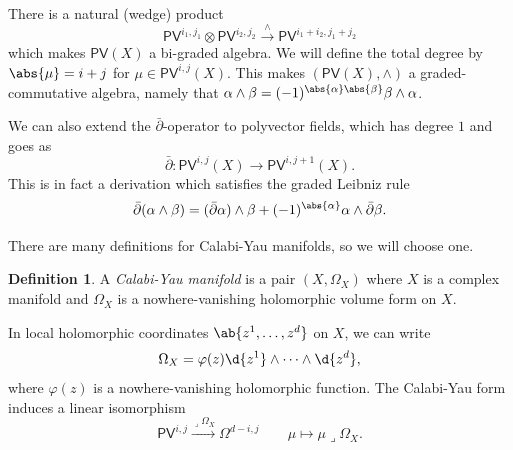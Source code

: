 \documentclass{amsart}
\theoremstyle{definition}
\newtheorem{defn}[thm]{Definition}
\theoremstyle{remark}
\theoremstyle{plain}
\theoremstyle{definition}
\theoremstyle{remark}
\newcommand{\ms}[1]{\mathsf{#1}}
\newcommand{\1}{\mathbf{1}}
\newcommand{\2}{\mathbf{2}}
\newcommand{\3}{\mathbf{3}}
\newcommand{\dbar}{\bar{\partial}}
\begin{document}
There is a natural (wedge) product
\[ \ms{PV}^{i_1, j_1} \otimes \ms{PV}^{i_2, j_2} \xrightarrow{\wedge} \ms{PV}^{i_1 + i_2, j_1 + j_2} \]
which makes \(\ms{PV}(X)\) a bi-graded algebra. We will define the total degree by \(\abs{\mu} = i + j\) for \(\mu \in \ms{PV}^{i,j}(X)\). This makes \((\ms{PV}(X), \wedge)\) a graded-commutative algebra, namely that \(\alpha \wedge \beta = (-1)^{\abs{\alpha} \abs{\beta}} \beta \wedge \alpha\).

We can also extend the \(\dbar\)-operator to polyvector fields, which has degree \(1\) and goes as
\[ \dbar \colon \ms{PV}^{i,j}(X) \to \ms{PV}^{i, j+1}(X). \]
This is in fact a derivation which satisfies the graded Leibniz rule
\[ \dbar (\alpha \wedge \beta) = (\dbar \alpha) \wedge \beta + (-1)^{\abs{\alpha}} \alpha \wedge \dbar \beta. \]

There are many definitions for Calabi-Yau manifolds, so we will choose one.
\begin{defn}
    A \textit{Calabi-Yau manifold} is a pair \((X, \Omega_X)\) where \(X\) is a complex manifold and \(\Omega_X\) is a nowhere-vanishing holomorphic volume form on \(X\). 
\end{defn}

In local holomorphic coordinates \(\ab\{z^1, \ldots, z^d\}\) on \(X\), we can write
\[ \Omega_X = \varphi(z) \d{z^1} \wedge \cdots \wedge \d{z^d}, \]
where \(\varphi(z)\) is a nowhere-vanishing holomorphic function. The Calabi-Yau form induces a linear isomorphism
\[ \ms{PV}^{i,j} \xrightarrow{\lrcorner \Omega_X} \Omega^{d-i, j} \qquad \mu \mapsto \mu \lrcorner \Omega_X. \]
\end{document}
